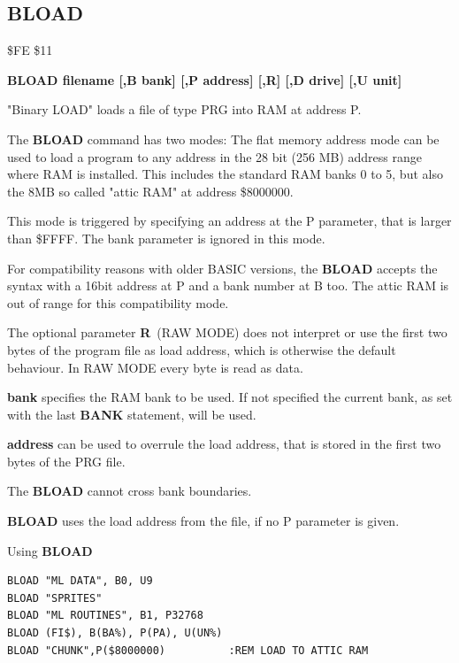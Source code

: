 \subsection{BLOAD}
\begin{description}[leftmargin=2cm,style=nextline]
\item [Token:] \$FE \$11
\item [Format:] {\bf BLOAD filename [,B bank] [,P address] [,R] [,D drive] [,U unit] }
\item [Usage:]
   "Binary LOAD" loads a file of type PRG into RAM at address P.

   The {\bf BLOAD} command has two modes:
   The flat memory address mode can be used to load a program to any
   address in the 28 bit (256 MB) address range where RAM is installed.
   This includes the standard RAM banks 0 to 5, but also
   the 8MB so called "attic RAM" at address \$8000000.

   This mode is triggered by specifying an address at the P parameter,
   that is larger than \$FFFF. The bank parameter is ignored in this mode.

   For compatibility reasons with older BASIC versions, the {\bf BLOAD}
   accepts the syntax with a 16bit address at P and a bank number at B too.
   The attic RAM is out of range for this compatibility mode.

   The optional parameter {\bf R} (RAW MODE) does not interpret or use the
   first two bytes of the program file as load address, which is otherwise the
   default behaviour. In RAW MODE every byte is read as data.

   \filenamedefinition

   {\bf bank} specifies the RAM bank to be used.
   If not specified the current bank, as set with the last
   {\bf BANK} statement, will be used.

   {\bf address} can be used to overrule the load address,
   that is stored in the first two bytes of the PRG file.

   \drivedefinition

   \unitdefinition

\item [Remarks:]
   The {\bf BLOAD} cannot cross bank boundaries.

{\bf BLOAD} uses the load address from the file, if no P parameter is given.

\item [Example:] Using {\bf BLOAD}
\begin{tcolorbox}[colback=black,coltext=white]
\verbatimfont{\codefont}
\begin{verbatim}
BLOAD "ML DATA", B0, U9
BLOAD "SPRITES"
BLOAD "ML ROUTINES", B1, P32768
BLOAD (FI$), B(BA%), P(PA), U(UN%)
BLOAD "CHUNK",P($8000000)          :REM LOAD TO ATTIC RAM
\end{verbatim}
\end{tcolorbox}
\end{description}

